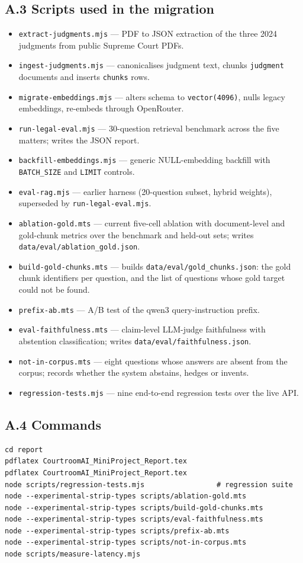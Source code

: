 \documentclass[12pt]{article}
\begin{document}
\subsection*{A.3 Scripts used in the migration}
\begin{itemize}
\item \texttt{extract-judgments.mjs} --- PDF to JSON extraction of the three 2024 judgments from public Supreme Court PDFs.
\item \texttt{ingest-judgments.mjs} --- canonicalises judgment text, chunks \texttt{judgment} documents and inserts \texttt{chunks} rows.
\item \texttt{migrate-embeddings.mjs} --- alters schema to \texttt{vector(4096)}, nulls legacy embeddings, re-embeds through OpenRouter.
\item \texttt{run-legal-eval.mjs} --- 30-question retrieval benchmark across the five matters; writes the JSON report.
\item \texttt{backfill-embeddings.mjs} --- generic NULL-embedding backfill with \texttt{BATCH\_SIZE} and \texttt{LIMIT} controls.
\item \texttt{eval-rag.mjs} --- earlier harness (20-question subset, hybrid weights), superseded by \texttt{run-legal-eval.mjs}.
\item \texttt{ablation-gold.mts} --- current five-cell ablation with document-level and gold-chunk metrics over the benchmark and held-out sets; writes \texttt{data/eval/ablation\_gold.json}.
\item \texttt{build-gold-chunks.mts} --- builds \texttt{data/eval/gold\_chunks.json}: the gold chunk identifiers per question, and the list of questions whose gold target could not be found.
\item \texttt{prefix-ab.mts} --- A/B test of the qwen3 query-instruction prefix.
\item \texttt{eval-faithfulness.mts} --- claim-level LLM-judge faithfulness with abstention classification; writes \texttt{data/eval/faithfulness.json}.
\item \texttt{not-in-corpus.mts} --- eight questions whose answers are absent from the corpus; records whether the system abstains, hedges or invents.
\item \texttt{regression-tests.mjs} --- nine end-to-end regression tests over the live API.
\end{itemize}

\subsection*{A.4 Commands}
{\footnotesize
\begin{verbatim}
cd report
pdflatex CourtroomAI_MiniProject_Report.tex
pdflatex CourtroomAI_MiniProject_Report.tex
node scripts/regression-tests.mjs                 # regression suite
node --experimental-strip-types scripts/ablation-gold.mts
node --experimental-strip-types scripts/build-gold-chunks.mts
node --experimental-strip-types scripts/eval-faithfulness.mts
node --experimental-strip-types scripts/prefix-ab.mts
node --experimental-strip-types scripts/not-in-corpus.mts
node scripts/measure-latency.mjs
\end{verbatim}
}
\end{document}
